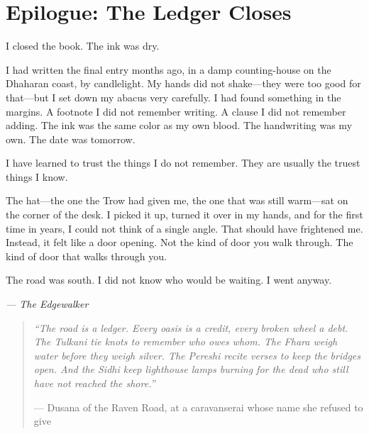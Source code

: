 \newpage

\newpage

\chapter*{Epilogue: The Ledger Closes}

\noindent
{\Large
I closed the book. The ink was dry.

\vspace{0.5em}

I had written the final entry months ago, in a damp counting-house on the Dhaharan coast, by candlelight. My hands did not shake---they were too good for that---but I set down my abacus very carefully. I had found something in the margins. A footnote I did not remember writing. A clause I did not remember adding. The ink was the same color as my own blood. The handwriting was my own. The date was tomorrow.

\vspace{0.5em}

I have learned to trust the things I do not remember. They are usually the truest things I know.

\vspace{0.5em}

The hat---the one the Trow had given me, the one that was still warm---sat on the corner of the desk. I picked it up, turned it over in my hands, and for the first time in years, I could not think of a single angle. That should have frightened me. Instead, it felt like a door opening. Not the kind of door you walk through. The kind of door that walks through you.

\vspace{0.5em}

The road was south. I did not know who would be waiting. I went anyway.
}

\vspace{1em}

\noindent\textit{--- The Edgewalker}

\vspace{1em}


\vspace{2em}
\begin{quote}
\small
\textit{``The road is a ledger. Every oasis is a credit, every broken wheel a debt. The Tulkani tie knots to remember who owes whom. The Fhara weigh water before they weigh silver. The Pereshi recite verses to keep the bridges open. And the Sidhi keep lighthouse lamps burning for the dead who still have not reached the shore.''}

\noindent --- Dusana of the Raven Road, at a caravanserai whose name she refused to give
\end{quote}